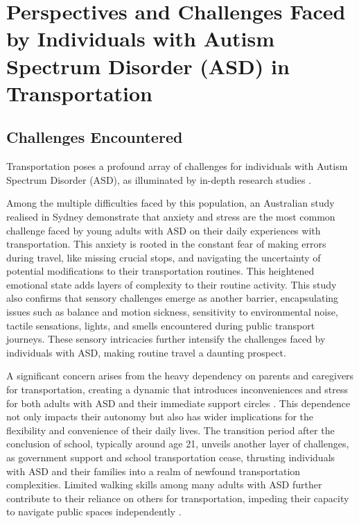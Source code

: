 \section{Perspectives and Challenges Faced by Individuals with Autism Spectrum Disorder (ASD) in Transportation}

\subsection{Challenges Encountered}

    Transportation poses a profound array of challenges for individuals with Autism Spectrum Disorder (ASD), as illuminated by in-depth research studies \cite{falkmer_viewpoints_2015} \cite{deka_co-principal_nodate} \cite{haas_experiences_nodate}. 
    
    Among the multiple difficulties faced by this population, an Australian study realised in Sydney  \cite{haas_experiences_nodate} demonstrate that anxiety and stress are the most common challenge faced by young adults with ASD on their daily experiences with transportation. This anxiety is rooted in the constant fear of making errors during travel, like missing crucial stops, and navigating the uncertainty of potential modifications to their transportation routines. This heightened emotional state adds layers of complexity to their routine activity. 
    This study also confirms that sensory challenges emerge as another barrier, encapsulating issues such as balance and motion sickness, sensitivity to environmental noise, tactile sensations, lights, and smells encountered during public transport journeys. These sensory intricacies further intensify the challenges faced by individuals with ASD, making routine travel a daunting prospect. 
    
    A significant concern arises from the heavy dependency on parents and caregivers for transportation, creating a dynamic that introduces inconveniences and stress for both adults with ASD and their immediate support circles \cite{deka_co-principal_nodate}. This dependence not only impacts their autonomy but also has wider implications for the flexibility and convenience of their daily lives.
    The transition period after the conclusion of school, typically around age 21, unveils another layer of challenges, as government support and school transportation cease, thrusting individuals with ASD and their families into a realm of newfound transportation complexities. 
    Limited walking skills among many adults with ASD further contribute to their reliance on others for transportation, impeding their capacity to navigate public spaces independently \cite{deka_co-principal_nodate}. 
    
